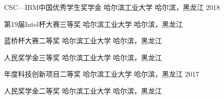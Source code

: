 


\vspace{-1.5mm}
\begin{cvhonors}

\cvhonor
{CSC—IBM中国优秀学生奖学金} %
{哈尔滨工业大学} %
{哈尔滨，黑龙江} %
{2018} %


\cvhonor
{第19届Intel杯大赛三等奖} %
{哈尔滨工业大学} %
{哈尔滨，黑龙江} %
{} %


\cvhonor
{蓝桥杯大赛二等奖} %
{哈尔滨工业大学} %
{哈尔滨，黑龙江} %
{} %


\cvhonor
{人民奖学金三等奖} %
{哈尔滨工业大学} %
{哈尔滨，黑龙江} %
{} %


\cvhonor
{年度科技创新项目二等奖} %
{哈尔滨工业大学} %
{哈尔滨，黑龙江} %
{2017} %


\cvhonor
{人民奖学金二等奖} %
{哈尔滨工业大学} %
{哈尔滨，黑龙江} %
{} %

\end{cvhonors}